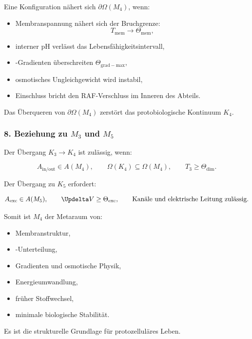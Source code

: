 Eine Konfiguration nähert sich $\partial\Omega(M_4)$, wenn:

\begin{itemize}
    \item Membranspannung nähert sich der Bruchgrenze:
    \[
    T_{\mathrm{mem}} \to \Theta_{\mathrm{mem}},
    \]
    \item interner pH verlässt das Lebensfähigkeitsintervall,
    \item-Gradienten überschreiten $\Theta_{\mathrm{grad-max}}$,
    \item osmotisches Ungleichgewicht wird instabil,
    \item Einschluss bricht den RAF-Verschluss im Inneren des Abteils.
\end{itemize}

Das Überqueren von $\partial\Omega(M_4)$ zerstört das protobiologische Kontinuum $K_4$.

\subsubsection*{8. Beziehung zu \texorpdfstring{$M_3$}{M_3} und \texorpdfstring{$M_5$}{M_5}}

Der Übergang $K_3 \to K_4$ ist zulässig, wenn:

\[
A_{\mathrm{in/out}} \in A(M_4),
\qquad
\Omega(K_4) \subseteq \Omega(M_4),
\qquad
T_3 \ge\Theta_{\mathrm{dim}}.
\]

Der Übergang zu $K_5$ erfordert:

\[
A_{\mathrm{exc}} \in A(M_5),
\qquad
\Updelta V\ge\Theta_{\mathrm{exc}},
\qquad
\text{Kanäle und elektrische Leitung zulässig}.
\]

Somit ist $M_4$ der Metaraum von:

\begin{itemize}
    \item Membranstruktur,
    \item-Unterteilung,
    \item Gradienten und osmotische Physik,
    \item Energieumwandlung,
    \item früher Stoffwechsel,
    \item minimale biologische Stabilität.
\end{itemize}

Es ist die strukturelle Grundlage für protozelluläres Leben.
